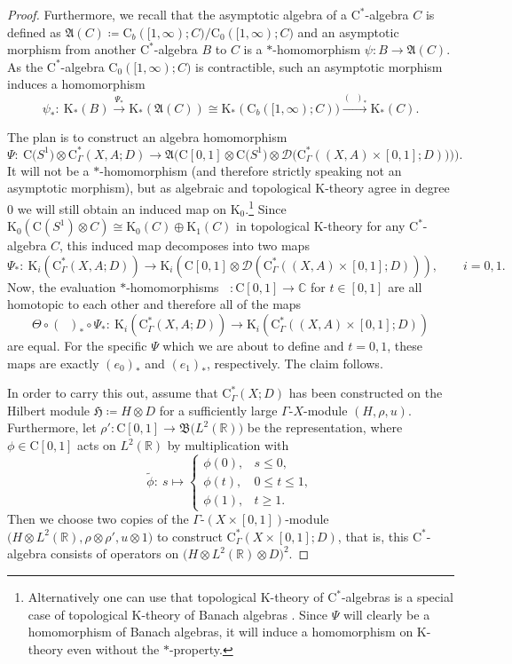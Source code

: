\documentclass[pdftex]{sigma}
\numberwithin{equation}{section}
\theoremstyle{definition}
\newcommand{\R}{\mathbb{R}}
\newcommand{\C}{\mathbb{C}}
\newcommand{\Ct}{\mathrm{C}}
\newcommand{\Cz}{\Ct_0}
\newcommand{\Cb}{\Ct_b}
\newcommand{\HilbertMod}{\mathfrak{H}}
\newcommand{\ev}[1]{\mathop{\textrm{ev}_{#1}}}
\newcommand{\K}{\mathrm{K}}
\newcommand{\textCstar}{\ensuremath{\mathrm{C}^*\!}}
\newcommand{\Roe}{\mathrm{C}^*}
\newcommand{\Lin}{{\mathfrak{B}}}
\newcommand{\doubleplier}{{\mathcal{D}}}
\newcommand{\Asymp}{\mathfrak{A}}
\begin{document}
\begin{proof}
Furthermore, we recall that the asymptotic algebra of a \textCstar-algebra $C$ is defined as $\Asymp(C)\coloneqq \Cb([1,\infty);C)/\Cz([1,\infty);C)$ and an asymptotic morphism from another \textCstar-algebra $B$ to $C$ is a $*$-homomorphism $\psi\colon B\to\Asymp(C)$. As the \textCstar-algebra $\Cz([1,\infty);C)$ is contractible, such an asymptotic morphism induces a homomorphism
\[
\psi_*\colon\ \K_*(B)\xrightarrow{\Psi_*}\K_*(\Asymp(C))\cong\K_*(\Cb([1,\infty);C))\xrightarrow{(\ev{1})_*}\K_*(C).
\]

The plan is to construct an algebra homomorphism
\begin{equation}\label{eq:AsympDoublealgebrahom}
\Psi\colon\ \Ct\big(S^1\big)\otimes\Roe_\Gamma(X,A;D)\to \Asymp\big(\Ct[0,1]\otimes\Ct\big(S^1\big)\otimes\doubleplier\big(\Roe_\Gamma((X,A)\times[0,1];D))\big)\big).
\end{equation}
It will not be a $*$-homomorphism (and therefore strictly speaking not an asymptotic morphism), but as algebraic and topological $\K$-theory agree in degree $0$ we will still obtain an induced map on $\K_0$.\footnote{Alternatively one can use that topological $\K$-theory of \textCstar-algebras is a special case of topological $\K$-theory of Banach algebras \cite[Chapters 5 and~8]{BlaKK}. Since $\Psi$ will clearly be a homomorphism of Banach algebras, it will induce a homomorphism on $\K$-theory even without the $*$-property.}
Since $\K_0(\Ct(S^1)\otimes C)\cong \K_0(C)\oplus \K_1(C)$ in topological $\K$-theory for any $\textCstar$-algebra $C$, this induced map decomposes into two maps
\[
\Psi_*\colon\ \K_i(\Roe_\Gamma(X,A;D))\to\K_i(\Ct[0,1]\otimes\doubleplier(\Roe_\Gamma((X,A)\times[0,1];D))),\qquad i=0,1.
\]
Now, the evaluation $*$-homomorphisms $\ev{t}\colon\Ct[0,1]\to \C$ for $t\in[0,1]$ are all homotopic to each other and therefore all of the maps
\[
\Theta\circ(\ev{t})_*\circ\Psi_*\colon\ \K_i(\Roe_\Gamma(X,A;D))\to \K_i(\Roe_\Gamma((X,A)\times[0,1];D))
\]
are equal.
For the specific $\Psi$ which we are about to define and $t=0,1$, these maps are exactly $(e_0)_*$ and $(e_1)_*$, respectively. The claim follows.

In order to carry this out, assume that $\Roe_\Gamma(X;D)$ has been constructed on the Hilbert module $\HilbertMod\coloneqq H\otimes D$ for a sufficiently large $\Gamma$-$X$-module $(H,\rho,u)$. Furthermore, let $\rho'\colon\Ct[0,1]\to\Lin\big(L^2(\R)\big)$ be the representation, where $\phi\in\Ct[0,1]$ acts on $L^2(\R)$ by multiplication with
\[
\tilde\phi\colon\ s\mapsto
\begin{cases}\phi(0),&s\leq0,\\\phi(t),&0\leq t\leq 1,\\\phi(1),&t\geq 1.
\end{cases}
\]
Then we choose two copies of the $\Gamma$-$(X\times[0,1])$-module $\big(H\otimes L^2(\R),\rho\otimes\rho',u\otimes 1\big)$ to construct $\Roe_\Gamma(X\times [0,1];D)$, that is, this \textCstar-algebra consists of operators on $\big(H\otimes L^2(\R)\otimes D\big)^2$.


\end{proof}
\end{document}
